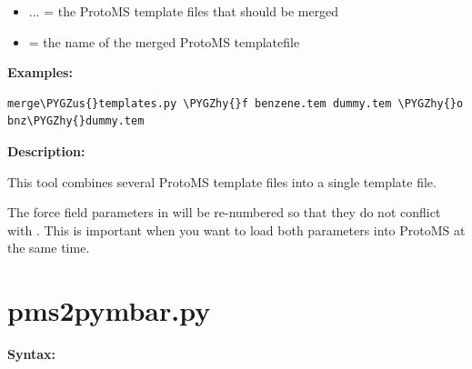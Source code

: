 \documentclass[letterpaper,10pt,english]{sphinxmanual}
\def\PYGZus{\char`\_}
\def\PYGZhy{\char`\-}
\begin{document}
\begin{itemize}
\item {} 
 ... = the ProtoMS template files that should be merged

\item {} 
 = the name of the merged ProtoMS templatefile

\end{itemize}

\textbf{Examples:}

\begin{Verbatim}[frame=single,commandchars=\\\{\}]
merge\PYGZus{}templates.py \PYGZhy{}f benzene.tem dummy.tem \PYGZhy{}o bnz\PYGZhy{}dummy.tem
\end{Verbatim}

\textbf{Description:}

This tool combines several ProtoMS template files into a single template file.

The force field parameters in  will be re-numbered so that they do not conflict with . This is important when you want to load both parameters into ProtoMS at the same time.


\section{pms2pymbar.py}
\label{tools:pms2pymbar-py}
\textbf{Syntax:}
\end{document}
